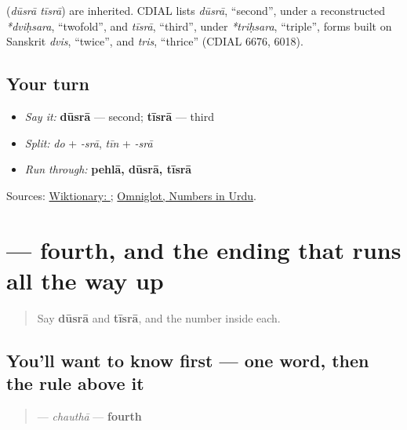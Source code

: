 \begin{cousinweb}
\textbf{ } (\emph{dūsrā tīsrā}) are inherited. CDIAL lists \emph{dūsrā}, \textquotedblleft{}second\textquotedblright{}, under a reconstructed \emph{*dviḥsara}, \textquotedblleft{}twofold\textquotedblright{}, and \emph{tīsrā}, \textquotedblleft{}third\textquotedblright{}, under \emph{*triḥsara}, \textquotedblleft{}triple\textquotedblright{}, forms built on Sanskrit \emph{dvis}, \textquotedblleft{}twice\textquotedblright{}, and \emph{tris}, \textquotedblleft{}thrice\textquotedblright{} (CDIAL 6676, 6018).
\end{cousinweb}

\subsection*{Your turn}
\begin{itemize}
\raggedright
  \item \emph{Say it:} \textbf{dūsrā} — second; \textbf{tīsrā} — third
  \item \emph{Split:} \emph{do} + \emph{-srā}, \emph{tīn} + \emph{-srā}
  \item \emph{Run through:} \textbf{pehlā, dūsrā, tīsrā}
\end{itemize}

\begin{tcolorbox}[breakable,colback=teal!4,colframe=teal!35!black,title={Before you move on}]
Sources: \href{https://en.wiktionary.org/wiki/\%D8\%AF\%D9\%88\%D8\%B3\%D8\%B1\%D8\%A7}{Wiktionary: }; \href{https://www.omniglot.com/language/numbers/urdu.htm}{Omniglot, Numbers in Urdu}.
\end{tcolorbox}
\section[\texorpdfstring{\ur{چوتھا} (chauthā)}{چوتھا (chauthā)}]{ — fourth, and the ending that runs all the way up}

\label{lesson:UR-C32-chautha}



\begin{quote}
Say \textbf{dūsrā} and \textbf{tīsrā}, and the number inside each.
\end{quote}

\subsection*{You'll want to know first — one word, then the rule above it}
\begin{quote}
\textbf{} — \emph{chauthā} — \textbf{fourth}
\end{quote}

